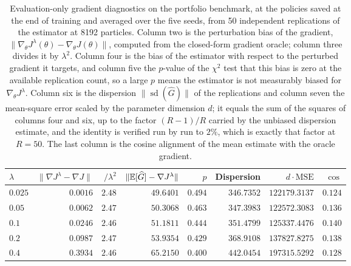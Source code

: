 \begin{table}[H]
\centering
\small
\begin{tabular}{lrrrrrrr}
\toprule
$\lambda$ & $\lVert\nabla J^\lambda-\nabla J\rVert$ & $/\lambda^2$ & $\lVert\mathbb{E}[\widehat G]-\nabla J^\lambda\rVert$ & $p$ & Dispersion & $d\cdot\mathrm{MSE}$ & $\cos$ \\
\midrule
$0.025$ & $0.0016$ & $2.48$ & $49.6401$ & $0.494$ & $346.7352$ & $122179.3137$ & $0.124$ \\
$0.05$ & $0.0062$ & $2.47$ & $50.3068$ & $0.463$ & $347.3983$ & $122572.3083$ & $0.136$ \\
$0.1$ & $0.0246$ & $2.46$ & $51.1811$ & $0.444$ & $351.4799$ & $125337.4476$ & $0.140$ \\
$0.2$ & $0.0987$ & $2.47$ & $53.9354$ & $0.429$ & $368.9108$ & $137827.8275$ & $0.138$ \\
$0.4$ & $0.3934$ & $2.46$ & $65.2150$ & $0.400$ & $442.0454$ & $197315.5292$ & $0.128$ \\
\bottomrule
\end{tabular}
\caption{Evaluation-only gradient diagnostics on the portfolio benchmark, at the policies saved at the end of training and averaged over the five seeds, from 50 independent replications of the estimator at 8192 particles. Column two is the perturbation bias of the gradient, $\lVert\nabla_\theta J^\lambda(\theta)-\nabla_\theta J(\theta)\rVert$, computed from the closed-form gradient oracle; column three divides it by $\lambda^2$. Column four is the bias of the estimator with respect to the perturbed gradient it targets, and column five the $p$-value of the $\chi^2$ test that this bias is zero at the available replication count, so a large $p$ means the estimator is not measurably biased for $\nabla_\theta J^\lambda$. Column six is the dispersion $\lVert\operatorname{sd}(\widehat G)\rVert$ of the replications and column seven the mean-square error scaled by the parameter dimension $d$; it equals the sum of the squares of columns four and six, up to the factor $(R-1)/R$ carried by the unbiased dispersion estimate, and the identity is verified run by run to $2\%$, which is exactly that factor at $R=50$. The last column is the cosine alignment of the mean estimate with the oracle gradient.}
\label{tab:gradient-diagnostics-portfolio}
\end{table}
